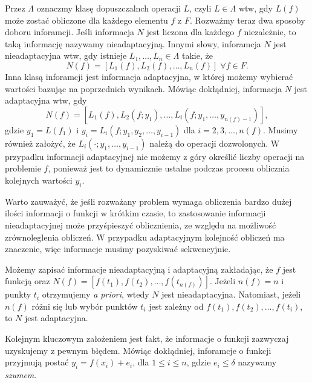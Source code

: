 \documentclass[oik, pdftex, robocza, man]{mgrwms}
\begin{document}
    Przez $\Lambda$ oznaczmy klasę dopuszczalnch operacji $L$, czyli $L \in \Lambda$ wtw, gdy $L(f)$ może zostać obliczone dla każdego elementu $f$ z $F$. Rozważmy teraz dwa sposoby doboru inforamcji. Jeśli informacja $N$ jest liczona dla każdego $f$ niezależnie, to taką informację nazywamy nieadaptacyjną. Innymi słowy, inforamcja $N$ jest nieadaptacyjna wtw, gdy istnieje $L_{1}, \ldots, L_{n} \in \Lambda$ takie, że
    \begin{equation*}
        N(f) = \left[ L_{1}(f), L_{2}(f), \ldots, L_{n}(f) \right] \; \forall f \in F.
    \end{equation*}
    Inna klasą inforamcji jest informacja adaptacyjna, w której możemy wybierać wartości bazując na poprzednich wynikach. Mówiąc dokłądniej, informacja $N$ jest adaptacyjna wtw, gdy
    \begin{equation*}
        N(f) = \left[ L_{1}(f), L_{2}(f; y_{1}), \ldots, L_{i}(f; y_{1}, \ldots, y_{n(f)-1}) \right],
    \end{equation*}
    gdzie $y_{1} = L(f_{1})$ i $y_{i} = L_{i}(f; y_{1}, y_{2}, \ldots, y_{i-1})$ dla $i=2,3,\ldots,n(f)$. Musimy również założyć, że $L_{i}(\cdot;y_{1}, \ldots, y_{i-1})$ należą do operacji dozwolonych. W przypadku informacji adaptacyjnej nie możemy z góry określić liczby operacji na problemie $f$, ponieważ jest to dynamicznie ustalne podczas procesu oblicznia kolejnych wartości $y_{i}$.

    Warto zauważyć, że jeśli rozważany problem wymaga obliczenia bardzo dużej ilości informacji o funkcji w krótkim czasie, to zastosowanie informacji nieadaptacyjnej może przyśpieszyć oblicznienia, ze względu na możliwość zrównoleglenia obliczeń. W przypadku adaptacyjnym kolejność obliczeń ma znaczenie, więc informacje musimy pozyskiwać sekwencyjnie.

    Możemy zapisać informacje nieadaptacyjną i adaptacyjną zakładając, że $f$ jest funkcją oraz $N(f) = \left[ f(t_{1}), f(t_{2}), \ldots, f(t_{n(f)}) \right]$. Jeżeli $n(f) = n$ i punkty $t_{i}$ otrzymujemy \textit{a priori}, wtedy $N$ jest nieadaptacyjna. Natomiast, jeżeli $n(f)$ różni się lub wybór punktów $t_{i}$ jest zależny od $f(t_{1}), f(t_{2}), \ldots, f(t_{i})$, to $N$ jest adaptacyjna.

    Kolejnym kluczowym założeniem jest fakt, że informacje o funkcji zazwyczaj uzyskujemy z pewnym błędem. Mówiąc dokłądniej, inforamcje o funkcji przyjmują postać $y_{i} = f(x_{i}) + e_{i}$, dla $1 \leq i \leq n$, gdzie $e_{i} \leq \delta$ nazywamy \textit{szumem}.
    
\end{document}
